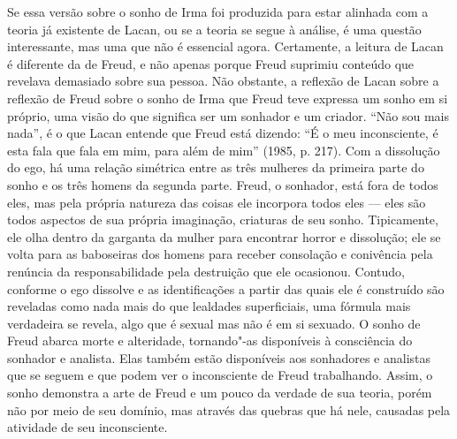 Se essa versão sobre o sonho de Irma foi produzida para estar alinhada
com a teoria já existente de Lacan, ou se a teoria se segue à análise, é
uma questão interessante, mas uma que não é essencial agora. Certamente,
a leitura de Lacan é diferente da de Freud, e não apenas porque Freud
suprimiu conteúdo que revelava demasiado sobre sua pessoa. Não obstante,
a reflexão de Lacan sobre a reflexão de Freud sobre o sonho de Irma que
Freud teve expressa um sonho em si próprio, uma visão do que significa
ser um sonhador e um criador. ``Não sou mais nada'', é o que Lacan
entende que Freud está dizendo: ``É o meu inconsciente, é esta fala que
fala em mim, para além de mim'' (1985, p. 217). Com a dissolução do ego, há
uma relação simétrica entre as três mulheres da primeira parte do sonho
e os três homens da segunda parte. Freud, o sonhador, está fora de todos
eles, mas pela própria natureza das coisas ele incorpora todos eles ---
eles são todos aspectos de sua própria imaginação, criaturas de seu
sonho. Tipicamente, ele olha dentro da garganta da mulher para encontrar
horror e dissolução; ele se volta para as baboseiras dos homens para
receber consolação e conivência pela renúncia da responsabilidade pela
destruição que ele ocasionou. Contudo, conforme o ego dissolve e as
identificações a partir das quais ele é construído são reveladas como
nada mais do que lealdades superficiais, uma fórmula mais verdadeira se
revela, algo que é sexual mas não é em si sexuado. O sonho de Freud
abarca morte e alteridade, tornando"-as disponíveis à consciência do
sonhador e analista. Elas também estão disponíveis aos sonhadores e
analistas que se seguem e que podem ver o inconsciente de Freud
trabalhando. Assim, o sonho demonstra a arte de Freud e um pouco da
verdade de sua teoria, porém não por meio de seu domínio, mas através
das quebras que há nele, causadas pela atividade de seu inconsciente.

